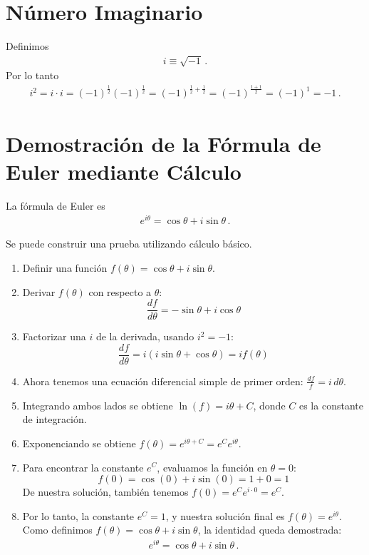 \documentclass[11pt,a4paper]{article}
\begin{document}
\appendix
\section{Número Imaginario}
Definimos
\begin{align}
    i \equiv \sqrt{-1}\,.
\end{align}
Por lo tanto
\begin{align}
    i^2 = i\cdot i = (-1)^{\frac{1}{2}}(-1)^{\frac{1}{2}}=(-1)^{\frac{1}{2}+\frac{1}{2}}
    =(-1)^{\frac{1+1}{2}}= (-1)^1 = -1\,.
\end{align}
\section{Demostración de la Fórmula de Euler mediante Cálculo}
La fórmula de Euler es
    \begin{align*}
        e^{i\theta} = \cos\theta + i\sin\theta\,.
    \end{align*}

Se puede construir una prueba utilizando cálculo básico.
\begin{enumerate}
    \item Definir una función $f(\theta) = \cos\theta + i\sin\theta$.
    \item Derivar $f(\theta)$ con respecto a $\theta$:
    \[ \frac{df}{d\theta} = -\sin\theta + i\cos\theta \]
    \item Factorizar una $i$ de la derivada, usando $i^2=-1$:
    \[ \frac{df}{d\theta} = i(i\sin\theta + \cos\theta) = i f(\theta) \]
    \item Ahora tenemos una ecuación diferencial simple de primer orden: $\frac{df}{f} = i \, d\theta$.
    \item Integrando ambos lados se obtiene $\ln(f) = i\theta + C$, donde $C$ es la constante de integración.
    \item Exponenciando se obtiene $f(\theta) = e^{i\theta+C} = e^C e^{i\theta}$.
    \item Para encontrar la constante $e^C$, evaluamos la función en $\theta=0$:
    \[ f(0) = \cos(0) + i\sin(0) = 1 + 0 = 1 \]
    De nuestra solución, también tenemos $f(0) = e^C e^{i \cdot 0} = e^C$.
    \item Por lo tanto, la constante $e^C=1$, y nuestra solución final es $f(\theta) = e^{i\theta}$. Como definimos $f(\theta) = \cos\theta + i\sin\theta$, la identidad queda demostrada:
    \begin{align}
    \boxed{
        e^{i\theta} = \cos\theta + i\sin\theta\,.
        }
    \end{align}
\end{enumerate}
\end{document}
